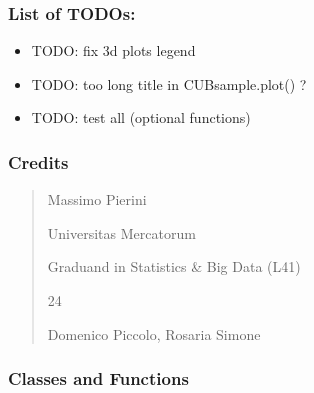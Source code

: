 \documentclass[letterpaper,10pt,english]{sphinxmanual}
\begin{document}
\subsubsection{List of TODOs:}
\label{\detokenize{cubmods:id108}}\begin{itemize}
\item {} 
\sphinxAtStartPar
TODO: fix 3d plots legend

\item {} 
\sphinxAtStartPar
TODO: too long title in CUBsample.plot() ?

\item {} 
\sphinxAtStartPar
TODO: test all  (optional functions)

\end{itemize}


\subsubsection{Credits}
\label{\detokenize{cubmods:credits}}\begin{quote}\begin{description}
\sphinxAtStartPar
Massimo Pierini

\sphinxAtStartPar
Universitas Mercatorum

\sphinxAtStartPar
Graduand in Statistics \& Big Data (L41)

\sphinxhyphen{}24

\sphinxAtStartPar
Domenico Piccolo, Rosaria Simone

\sphinxAtStartPar
{}

\end{description}\end{quote}


\subsubsection{Classes and Functions}
\label{\detokenize{cubmods:id109}}
\end{document}
